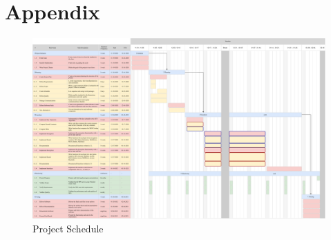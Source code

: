 \chapter{Appendix}
\begin{figure}[h]
  \includegraphics[height=1.05\textwidth, angle=270]{data/figures/gantt.pdf}
	\caption{Project Schedule}
	\label{fig:gantt}
\end{figure}
